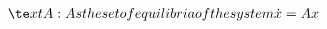 \documentclass[preview]{standalone}
\begin{document}
\begin{align*}
\te x t{A: As the set of equilibria of the system } \dot{ x } = A x
\end{align*}
\end{document}
